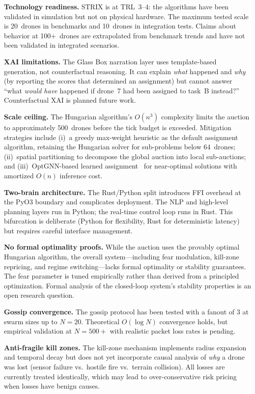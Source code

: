 \documentclass[conference]{IEEEtran}
\begin{document}
\textbf{Technology readiness.}\quad
STRIX is at TRL~3--4: the algorithms have been validated in simulation
but not on physical hardware.  The maximum tested scale is 20~drones
in benchmarks and 10~drones in integration tests.  Claims about
behavior at 100{+}~drones are extrapolated from benchmark trends and
have not been validated in integrated scenarios.

\textbf{XAI limitations.}\quad
The Glass Box narration layer uses template-based generation, not
counterfactual reasoning.  It can explain \emph{what} happened and
\emph{why} (by reporting the scores that determined an assignment) but
cannot answer ``what \emph{would have} happened if drone~7 had been
assigned to task~B instead?''  Counterfactual XAI is planned future
work.

\textbf{Scale ceiling.}\quad
The Hungarian algorithm's $O(n^3)$ complexity limits the auction to
approximately 500~drones before the tick budget is exceeded.
Mitigation strategies include (i)~a greedy max-weight heuristic as
the default assignment algorithm, retaining the Hungarian solver for
sub-problems below 64~drones; (ii)~spatial partitioning to decompose
the global auction into local sub-auctions; and (iii)~OptGNN-based
learned assignment~\cite{optgnn2024} for near-optimal solutions with
amortized $O(n)$ inference cost.

\textbf{Two-brain architecture.}\quad
The Rust/Python split introduces FFI overhead at the PyO3 boundary
and complicates deployment.  The NLP and high-level planning layers
run in Python; the real-time control loop runs in Rust.  This
bifurcation is deliberate (Python for flexibility, Rust for
deterministic latency) but requires careful interface management.

\textbf{No formal optimality proofs.}\quad
While the auction uses the provably optimal Hungarian algorithm, the
overall system---including fear modulation, kill-zone repricing, and
regime switching---lacks formal optimality or stability guarantees.
The fear parameter is tuned empirically rather than derived from a
principled optimization.  Formal analysis of the closed-loop system's
stability properties is an open research question.

\textbf{Gossip convergence.}\quad
The gossip protocol has been tested with a fanout of 3 at swarm sizes
up to $N=20$.  Theoretical $O(\log N)$ convergence holds, but
empirical validation at $N=500{+}$ with realistic packet loss rates
is pending.

\textbf{Anti-fragile kill zones.}\quad
The kill-zone mechanism implements radius expansion and temporal decay
but does not yet incorporate causal analysis of \emph{why} a drone
was lost (sensor failure vs.\ hostile fire vs.\ terrain collision).
All losses are currently treated identically, which may lead to
over-conservative risk pricing when losses have benign causes.
\end{document}
